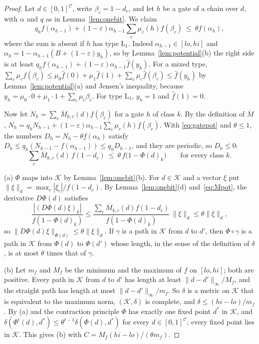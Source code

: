 \documentclass[11pt]{amsart}
\theoremstyle{definition}
\theoremstyle{remark}
\newcommand{\eps}{\varepsilon}
\begin{document}
\begin{proof}
Let $d\in[0,1]^{\mathcal C}$, write $\beta_c=1-d_c$, and let $h$ be a gate of a chain over $d$,
with $\alpha$ and $q$ as in Lemma~\ref{lem:onebit}. We claim
\begin{equation}\label{eq:gatepot}
q_hf(\alpha_{h-1})+(1-\eps)\alpha_{h-1}\sum_c\mu_c(h)f(\beta_c)\ \le\ \theta f(\alpha_h),
\end{equation}
where the sum is absent if $h$ has type $\mathrm L_1$. Indeed $\alpha_{h-1}\in[lo,hi]$ and
$\alpha_h=1-\alpha_{h-1}(B+(1-\eps)y_h)$, so by Lemma~\ref{lem:potential}(b) the right side is at
least $q_hf(\alpha_{h-1})+(1-\eps)\alpha_{h-1}\hat f(y_h)$. For a mixed type,
$\sum_c\mu_cf(\beta_c)\le\mu_0\hat f(0)+\mu_1\hat f(1)+\sum_c\mu_c\hat f(\beta_c)\le\hat f(y_h)$ by
Lemma~\ref{lem:potential}(a) and Jensen's inequality, because
$y_h=\mu_0\cdot0+\mu_1\cdot1+\sum_c\mu_c\beta_c$. For type $\mathrm L_1$, $y_h=1$ and
$\hat f(1)=0$.

Now let $N_h=\sum_c\overline M_{k,c}(d)f(\beta_c)$ for a gate $h$ of class $k$. By the definition
of $\overline M$, $N_h=q_hN_{h-1}+(1-\eps)\alpha_{h-1}\sum_c\mu_c(h)f(\beta_c)$. With
\eqref{eq:gatepot} and $\theta\le1$, the numbers $D_h=N_h-\theta f(\alpha_h)$ satisfy
$D_h\le q_h(N_{h-1}-f(\alpha_{h-1}))\le q_hD_{h-1}$, and they are periodic, so $D_h\le0$:
\begin{equation}\label{eq:Mpot}
\sum_c\overline M_{k,c}(d)\,f(1-d_c)\ \le\ \theta\,f\bigl(1-\Phi(d)_k\bigr)\qquad\text{for every class }k .
\end{equation}

(a) $\Phi$ maps into $\mathcal K$ by Lemma~\ref{lem:onebit}(b). For $d\in\mathcal K$ and a vector $\xi$ put
$\|\xi\|_d=\max_c|\xi_c|/f(1-d_c)$. By Lemma~\ref{lem:onebit}(d) and~\eqref{eq:Mpot}, the
derivative $D\Phi(d)$ satisfies
\[
\frac{|(D\Phi(d)\xi)_k|}{f(1-\Phi(d)_k)}\le\frac{\sum_c\overline M_{k,c}(d)f(1-d_c)}{f(1-\Phi(d)_k)}\,\|\xi\|_d\le\theta\|\xi\|_d ,
\]
so $\|D\Phi(d)\xi\|_{\Phi(d)}\le\theta\|\xi\|_d$. If $\gamma$ is a path in $\mathcal K$ from $d$ to $d'$,
then $\Phi\circ\gamma$ is a path in $\mathcal K$ from $\Phi(d)$ to $\Phi(d')$ whose length, in the sense of
the definition of $\delta$, is at most $\theta$ times that of $\gamma$.

(b) Let $m_f$ and $M_f$ be the minimum and the maximum of $f$ on $[lo,hi]$; both are positive.
Every path in $\mathcal K$ from $d$ to $d'$ has length at least $\|d-d'\|_\infty/M_f$, and the straight
path has length at most $\|d-d'\|_\infty/m_f$. So $\delta$ is a metric on $\mathcal K$ that is equivalent
to the maximum norm, $(\mathcal K,\delta)$ is complete, and $\delta\le(hi-lo)/m_f$. By (a) and the
contraction principle $\Phi$ has exactly one fixed point $d^*$ in $\mathcal K$, and
$\delta(\Phi^t(d),d^*)\le\theta^{t-1}\delta(\Phi(d),d^*)$ for every $d\in[0,1]^{\mathcal C}$; every
fixed point lies in $\mathcal K$. This gives (b) with $C=M_f(hi-lo)/(\theta m_f)$.


\end{proof}
\end{document}
